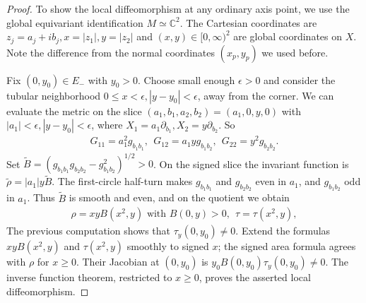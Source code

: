 \documentclass[letterpaper]{amsart}
\theoremstyle{definition}
\theoremstyle{remark}
\begin{document}
\begin{proof}
To show the local diffeomorphism at any ordinary axis point, we use the global equivariant identification $M \simeq \mathbb{C}^2$. The Cartesian coordinates are $z_j = a_j + i b_j, x= |z_1|, y=|z_2|$ and $(x,y) \in [0, \infty) ^2$ are global coordinates on $X$. Note the difference from the normal coordinates $(x_p, y_p)$ we used before. 

Fix $(0, y_0) \in E_{-}$ with $y_0>0$. Choose small enough $\epsilon >0$ and consider the tubular neighborhood $0 \leq x < \epsilon , |y-y_0|< \epsilon $, away from the corner. We can evaluate the metric on the slice $(a_1, b_1, a_2, b_2) = (a_1, 0, y, 0)$ with $|a_1|< \epsilon , |y-y_0|< \epsilon $, where $X_1 = a_1 \partial _{b_1}, X_2 = y \partial _{b_2}$. So
\begin{align*}
	G_{11} = a_1 ^2 g_{b_1 b_1},\ \ G_{12} = a_1 y g_{b_1 b_2},\ \ G_{22} = y ^2 g_{b_2b_2}.
\end{align*} 
Set $\tilde B=(g_{b_1b_1}g_{b_2b_2}-g_{b_1b_2}^2)^{1/2}>0$. On the signed slice the invariant function is $\tilde\rho=|a_1|y\tilde B$. The first-circle half-turn makes $g_{b_1b_1}$ and $g_{b_2b_2}$ even in $a_1$, and $g_{b_1b_2}$ odd in $a_1$. Thus $\tilde B$ is smooth and even, and on the quotient we obtain
\begin{align*}
	\rho = x y B (x ^2, y) \text{ with } B(0, y) >0,\ \ \tau = \tau (x ^2, y),
\end{align*} 
The previous computation shows that $\tau_y(0,y_0)\ne0$. Extend the formulas $xyB(x^2,y)$ and $\tau(x^2,y)$ smoothly to signed $x$; the signed area formula agrees with $\rho$ for $x\ge0$. Their Jacobian at $(0,y_0)$ is $y_0B(0,y_0)\tau_y(0,y_0)\ne0$. The inverse function theorem, restricted to $x\ge0$, proves the asserted local diffeomorphism.

\end{proof}
\end{document}
